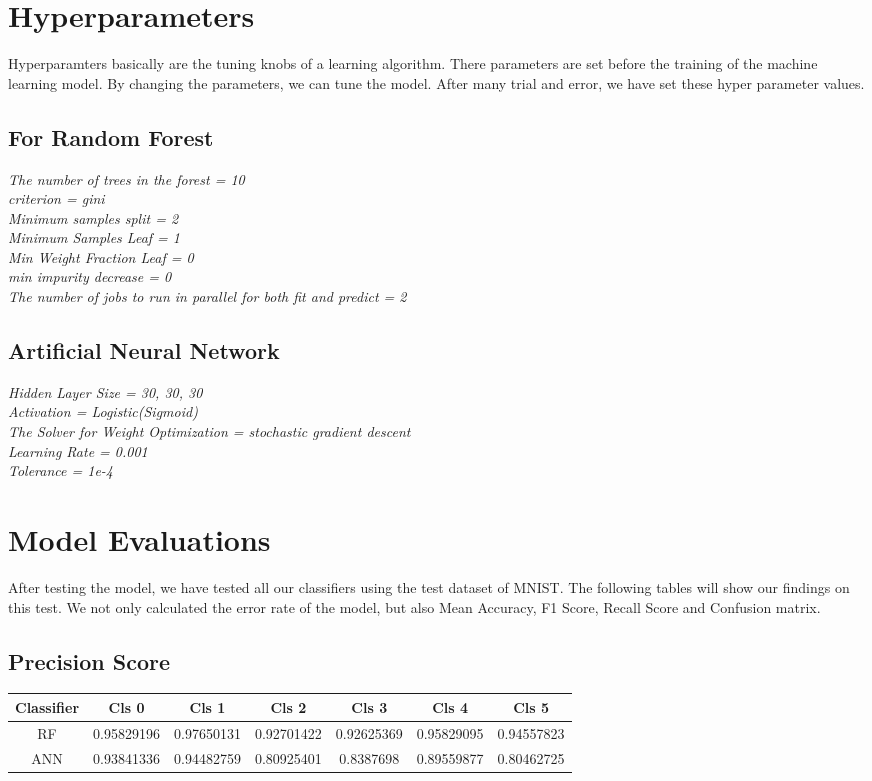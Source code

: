 \documentclass[12pt,a4paper]{article}
\begin{document}
\section{Hyperparameters}
Hyperparamters basically are the tuning knobs of a learning algorithm. There parameters are set before the training of the machine learning model.\cite{wiki:Hyperparameter} By changing the parameters, we can tune the model.\cite{hutter2014efficient} After many trial and error, we have set these hyper parameter values.
\subsection{For Random Forest}
\textit{The number of trees in the forest = 10}\\
\textit{criterion = gini}\\
\textit{Minimum samples split = 2}\\
\textit{Minimum Samples Leaf = 1}\\
\textit{Min Weight Fraction Leaf = 0}\\
\textit{min impurity decrease = 0}\\
\textit{The number of jobs to run in parallel for both fit and predict = 2}
\subsection{Artificial Neural Network}
\textit{Hidden Layer Size = 30, 30, 30}\\
\textit{Activation = Logistic(Sigmoid)}\\
\textit{The Solver for Weight Optimization = stochastic gradient descent}\\
\textit{Learning Rate = 0.001}\\
\textit{Tolerance = 1e-4}
\section{Model Evaluations}
After testing the model, we have tested all our classifiers using the test dataset of MNIST. The following tables will show our findings on this test. We not only calculated the error rate of the model, but also Mean Accuracy, F1 Score, Recall Score and Confusion matrix.
\subsection{Precision Score}
\begin{center}
\begin{tabular}{ || c c c c c c c|| } 
\hline
Classifier & Cls 0 & Cls 1 & Cls 2 & Cls 3 & Cls 4 & Cls 5\\
 \hline
 RF & 0.95829196 & 0.97650131 & 0.92701422 & 0.92625369 & 0.95829095 & 0.94557823\\ 
\hline
ANN & 0.93841336 & 0.94482759 & 0.80925401 & 0.8387698 & 0.89559877 & 0.80462725\\
 \hline
\end{tabular}
\end{center}
\end{document}

